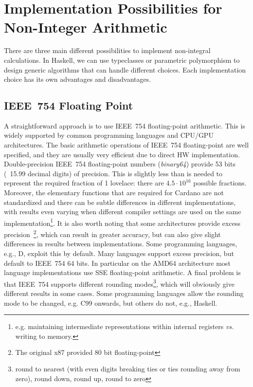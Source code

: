 \documentclass[11pt,a4paper,dvipsnames,twosided]{article}
\theoremstyle{definition}
\theoremstyle{definition}
\begin{document}
\section{Implementation Possibilities for Non-Integer Arithmetic}
\label{sec:impl-poss}

There are three main different possibilities to implement non-integral
calculations. In Haskell, we can use typeclasses or parametric polymorphism
to design generic algorithms that can handle different choices. Each implementation choice has its
own advantages and disadvantages.

\subsection{IEEE~754 Floating Point}
\label{sec:ieee-754-floating}

A straightforward approach is to use IEEE~754 floating-point arithmetic.  This is
widely supported by common programming languages and CPU/GPU architectures.
%
The basic arithmetic operations of IEEE~754 floating-point are well specified,
and they are usually very efficient due to direct HW implementation.
%
Double-precision IEEE~754 floating-point numbers (\emph{binary64}) provide 53 bits (~15.99 decimal digits) of
precision.  This is slightly less than is needed to represent the
required fraction of 1 lovelace: there are $4.5\cdot10^{16}$ possible fractions.
Moreover, the  elementary functions that are required for Cardano are not standardized and there can be
subtle differences in different implementations, with results even varying when different compiler settings are used
on the same implementation\footnote{e.g. maintaining intermediate representations within internal registers \emph{vs.} writing to memory.}. It is also worth noting that some architectures
provide excess precision~\footnote{The original x87 provided 80 bit
  floating-point}, which can result in greater accuracy, but can also give slight differences in results
between implementations. Some programming languages, e.g., D, exploit this by default. Many
languages support excess precision, but default to IEEE~754 64 bits. In
particular on the AMD64 architecture most language implementations use SSE floating-point arithmetic.
A final problem is that IEEE~754 supports different rounding modes\footnote{round to nearest (with even digits breaking ties or ties rounding away from zero), round down, round up, round to zero},  which will obviously give
different results in some cases.  Some programming languages allow the rounding mode to be changed, e.g. C99 onwards, but others do
not, e.g., Haskell.
\end{document}
